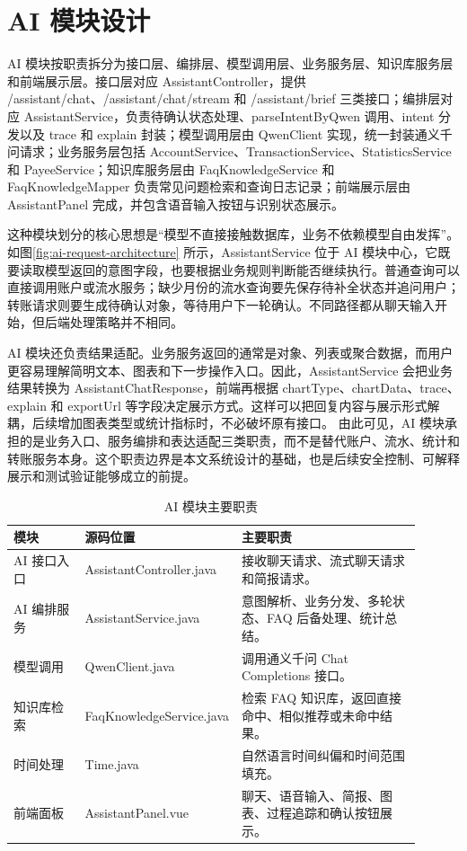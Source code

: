 \documentclass[bachelor, print]{xduthesis}
\begin{document}
\section{AI 模块设计}

AI 模块按职责拆分为接口层、编排层、模型调用层、业务服务层、知识库服务层和前端展示层。接口层对应 AssistantController，提供 /assistant/chat、/assistant/chat/stream 和 /assistant/brief 三类接口；编排层对应 AssistantService，负责待确认状态处理、parseIntentByQwen 调用、intent 分发以及 trace 和 explain 封装；模型调用层由 QwenClient 实现，统一封装通义千问请求；业务服务层包括 AccountService、TransactionService、StatisticsService 和 PayeeService；知识库服务层由 FaqKnowledgeService 和 FaqKnowledgeMapper 负责常见问题检索和查询日志记录；前端展示层由 AssistantPanel 完成，并包含语音输入按钮与识别状态展示。

这种模块划分的核心思想是“模型不直接接触数据库，业务不依赖模型自由发挥”。如图\ref{fig:ai-request-architecture} 所示，AssistantService 位于 AI 模块中心，它既要读取模型返回的意图字段，也要根据业务规则判断能否继续执行。普通查询可以直接调用账户或流水服务；缺少月份的流水查询要先保存待补全状态并追问用户；转账请求则要生成待确认对象，等待用户下一轮确认。不同路径都从聊天输入开始，但后端处理策略并不相同。

AI 模块还负责结果适配。业务服务返回的通常是对象、列表或聚合数据，而用户更容易理解简明文本、图表和下一步操作入口。因此，AssistantService 会把业务结果转换为 AssistantChatResponse，前端再根据 chartType、chartData、trace、explain 和 exportUrl 等字段决定展示方式。这样可以把回复内容与展示形式解耦，后续增加图表类型或统计指标时，不必破坏原有接口。
由此可见，AI 模块承担的是业务入口、服务编排和表达适配三类职责，而不是替代账户、流水、统计和转账服务本身。这个职责边界是本文系统设计的基础，也是后续安全控制、可解释展示和测试验证能够成立的前提。

\begin{table}[H]
    \centering
    \caption{AI 模块主要职责}
    \label{tab:ai-module-source}
    \begin{tabular}{|p{0.18\linewidth}|p{0.27\linewidth}|p{0.45\linewidth}|}
        \hline
        模块 & 源码位置 & 主要职责 \\
        \hline
        AI 接口入口 & AssistantController.java & 接收聊天请求、流式聊天请求和简报请求。 \\
        \hline
        AI 编排服务 & AssistantService.java & 意图解析、业务分发、多轮状态、FAQ 后备处理、统计总结。 \\
        \hline
        模型调用 & QwenClient.java & 调用通义千问 Chat Completions 接口。 \\
        \hline
        知识库检索 & FaqKnowledgeService.java & 检索 FAQ 知识库，返回直接命中、相似推荐或未命中结果。 \\
        \hline
        时间处理 & Time.java & 自然语言时间纠偏和时间范围填充。 \\
        \hline
        前端面板 & AssistantPanel.vue & 聊天、语音输入、简报、图表、过程追踪和确认按钮展示。 \\
        \hline
    \end{tabular}
\end{table}
\end{document}
